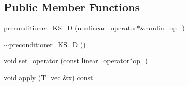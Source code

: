 \subsection*{Public Member Functions}
\begin{DoxyCompactItemize}
\item 
\hyperlink{classnonlinear__operators_1_1preconditioner__KS__2D_acf9e49a1a5beffe8bac97557f5f32b4e}{preconditioner\-\_\-\-K\-S\-\_\-D} (nonlinear\-\_\-operator$\ast$\&nonlin\-\_\-op\-\_\-)
\item 
\hyperlink{classnonlinear__operators_1_1preconditioner__KS__2D_a18243c4a96cabe61511150307b68542e}{$\sim$preconditioner\-\_\-\-K\-S\-\_\-D} ()
\item 
void \hyperlink{classnonlinear__operators_1_1preconditioner__KS__2D_a310aaba09422494d179ab9d69185bf2a}{set\-\_\-operator} (const linear\-\_\-operator$\ast$op\-\_\-)
\item 
void \hyperlink{classnonlinear__operators_1_1preconditioner__KS__2D_a253981fcff0614cae4d069534fbdef35}{apply} (\hyperlink{classnonlinear__operators_1_1preconditioner__KS__2D_ac8a7bc16e8f8296371167534fe482263}{T\-\_\-vec} \&x) const 
\end{DoxyCompactItemize}


